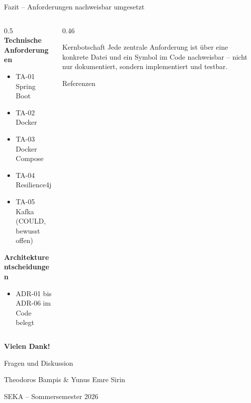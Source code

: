 \begin{frame}{Fazit -- Anforderungen nachweisbar umgesetzt}
  \begin{columns}[T,onlytextwidth]
    \begin{column}{0.5\textwidth}
      \textbf{Technische Anforderungen}
      \begin{itemize}
        \item[\textcolor{okgreen}{\checkmark}] TA-01 Spring Boot
        \item[\textcolor{okgreen}{\checkmark}] TA-02 Docker
        \item[\textcolor{okgreen}{\checkmark}] TA-03 Docker Compose
        \item[\textcolor{okgreen}{\checkmark}] TA-04 Resilience4j
        \item[\textcolor{codegray}{--}] TA-05 Kafka (COULD, bewusst offen)
      \end{itemize}

      \vspace{0.3cm}
      \textbf{Architekturentscheidungen}
      \begin{itemize}
        \item[\textcolor{okgreen}{\checkmark}] ADR-01 bis ADR-06 im Code belegt
      \end{itemize}
    \end{column}
    \begin{column}{0.46\textwidth}
      \begin{block}{Kernbotschaft}
        \small Jede zentrale Anforderung ist über eine konkrete Datei und ein
        Symbol im Code nachweisbar -- nicht nur dokumentiert, sondern
        implementiert und testbar.
      \end{block}

      \vspace{0.2cm}
      \begin{block}{Referenzen}
        \small
        \\
        \\
        \\
      \end{block}
    \end{column}
  \end{columns}
\end{frame}

\begin{frame}[plain]
  \begin{center}
    \hbrslogo
    \vspace{1.5cm}

    {\Huge\bfseries\color{darkblue} Vielen Dank!}\par
    \vspace{0.6cm}
    {\large Fragen und Diskussion}\par

    \vspace{1.5cm}
    {\large Theodoros Bampis \& Yunus Emre Sirin}\par
    {\large SEKA -- Sommersemester 2026}\par
  \end{center}
\end{frame}
